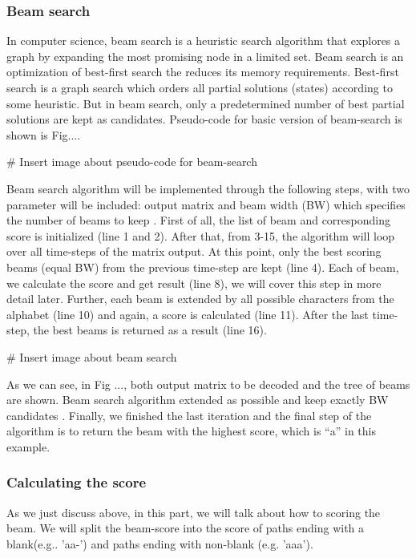       \subsubsection{ Beam search }
      In computer science, beam search is a heuristic search algorithm that
      explores a graph by expanding the most promising node in a limited set.
      Beam search is an optimization of best-first search the reduces its memory
      requirements. Best-first search is a graph search which orders all
      partial solutions (states) according to some heuristic. But in beam search,
      only a predetermined number of best partial solutions are kept as candidates.
      Pseudo-code for basic version of beam-search is shown is Fig....

      # Insert image about pseudo-code for beam-search
      
      Beam search algorithm will be implemented through the following steps, with two
      parameter will be included: output matrix and beam width (BW) which specifies the number
      of beams to keep . First of all, the list of beam and corresponding score is 
      initialized (line 1 and 2). After that, from 3-15, the algorithm will loop over all time-steps
      of the matrix output. At this point, only the best scoring beams (equal BW) from the previous
      time-step are kept (line 4). Each of beam, we calculate the score and get result (line 8), we will cover
      this step in more detail later. Further, each beam is extended by all possible characters from
      the alphabet (line 10) and again, a score is calculated (line 11). After the last time-step,
      the best beams is returned as a result (line 16).

      # Insert image about beam search

      As we can see, in Fig ..., both output matrix to be decoded and the tree of beams are shown. 
      Beam search algorithm extended as possible and keep exactly BW candidates . Finally,
      we finished the last iteration and the final step of the algorithm is to return the beam 
      with the highest score, which is “a” in this example.
      
      \subsubsection{ Calculating the score }
      As we just discuss above, in this part, we will talk about how to scoring the beam.
      We will split the beam-score into the score of paths ending with a blank(e.g.. 'aa-')
      and paths ending with non-blank (e.g. 'aaa'). 
      
